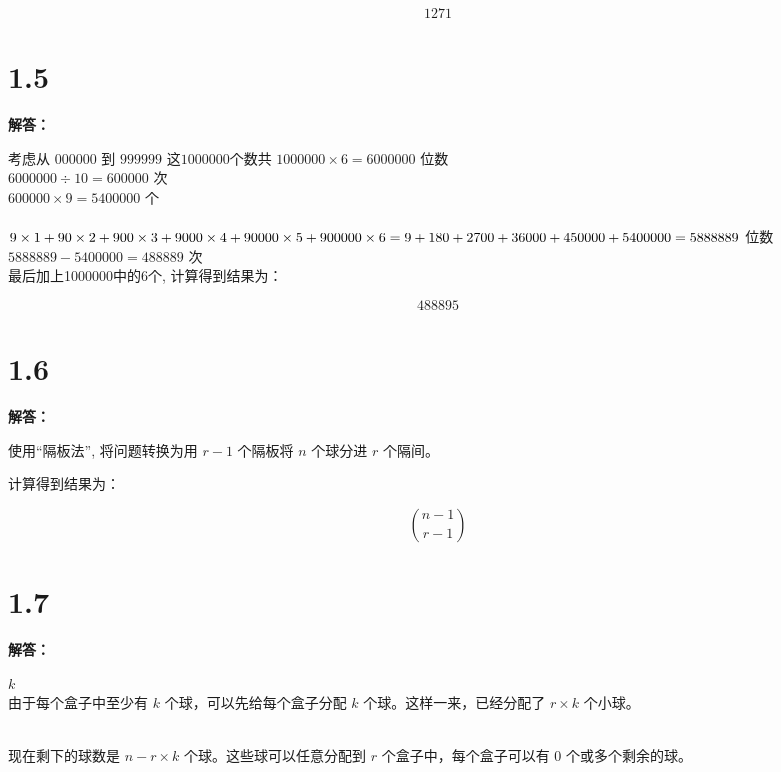 \documentclass{article}
\begin{document}
\[
\boxed{1271}
\]

\section*{1.5}

\textbf{解答：}

考虑从 $000000$ 到 $999999$ 这$1000000$个数共 $1000000 \times 6 = 6000000 $ 位数 \\

 $ 6000000 \div 10 = 600000 $ 次 \\

 $600000 \times 9 = 5400000$ 个 \\

 \\
$9 \times 1 + 90 \times 2 + 900 \times 3 + 9000 \times 4 + 90000 \times 5 + 900000 \times 6 \\
= 9 + 180 + 2700 + 36000 + 450000 + 5400000 \\
= 5888889 $ 位数 \\

 $5888889 - 5400000 = 488889$ 次 \\

最后加上1000000中的6个, 计算得到结果为：

\[
\boxed{488895}
\]

\section*{1.6}
\textbf{解答：}

使用“隔板法”, 将问题转换为用 $r - 1$ 个隔板将 $n$ 个球分进 $r$ 个隔间。

计算得到结果为：

\[
 \boxed{\binom{n - 1}{r - 1}}
\]

\section*{1.7}
\textbf{解答：}

  \( k \)  \\
由于每个盒子中至少有 \( k \) 个球，可以先给每个盒子分配 \( k \) 个球。这样一来，已经分配了 \( r \times k \) 个小球。

 \\
现在剩下的球数是 \( n - r \times k \) 个球。这些球可以任意分配到 \( r \) 个盒子中，每个盒子可以有 0 个或多个剩余的球。
\end{document}
